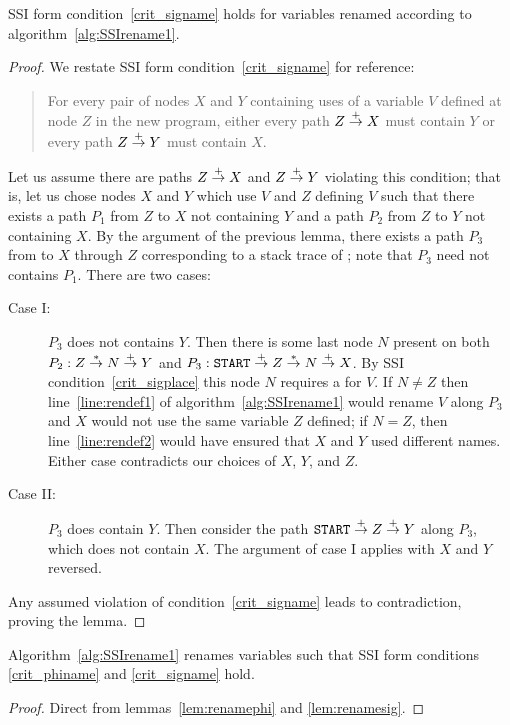 \documentclass[12pt,titlepage,twoside]{article}
\begin{document}
\begin{lemma}\label{lem:renamesig}
SSI form condition~\ref{crit_signame} holds for variables renamed
according to algorithm~\ref{alg:SSIrename1}.
\end{lemma}
\begin{proof}
We restate SSI form condition~\ref{crit_signame} for reference:
\begin{quote}
For every pair of nodes $X$ and $Y$ containing uses of a
variable $V$ defined at node $Z$ in the new program, either every path
$Z \stackrel{+}{\rightarrow} X$ must contain $Y$ or every path $Z \stackrel{+}{\rightarrow} Y$ must
contain $X$.
\end{quote}
Let us assume there are paths $Z\stackrel{+}{\rightarrow} X$ and $Z\stackrel{+}{\rightarrow} Y$
violating this condition; that is, let us chose nodes $X$ and $Y$
which use $V$ and $Z$ defining $V$ such that there exists a path $P_1$
from $Z$ to $X$ not containing $Y$ and a path $P_2$ from $Z$ to $Y$ not
containing $X$.  By the argument of the previous lemma, there exists
a path $P_3$ from  to $X$ through $Z$ corresponding to a stack
trace of ; note that $P_3$ need not contains $P_1$.
There are two cases:
\begin{description}
\item[Case I:] $P_3$ does not contains $Y$.  Then there is some last
node $N$ present on both $P_2: Z\stackrel{*}{\rightarrow} N\stackrel{+}{\rightarrow} Y$ and
$P_3: \texttt{START}\stackrel{+}{\rightarrow} Z\stackrel{*}{\rightarrow} N\stackrel{+}{\rightarrow} X$.  By SSI
condition~\ref{crit_sigplace} this node $N$ requires a \sigfunction{}
for $V$.  If $N\not=Z$ then line~\ref{line:rendef1} of
algorithm~\ref{alg:SSIrename1} would rename $V$ along $P_3$
and $X$ would not use the same variable $Z$ defined; if
$N=Z$, then line~\ref{line:rendef2} would have ensured that $X$
and $Y$ used different names.  Either case contradicts our choices of
$X$, $Y$, and $Z$.
\item[Case II:] $P_3$ does contain $Y$.  Then consider the path
$\texttt{START}\stackrel{+}{\rightarrow} Z\stackrel{+}{\rightarrow} Y$ along $P_3$, which does not
contain $X$.  The argument of case I applies with $X$ and $Y$ reversed.
\end{description}
Any assumed violation of condition~\ref{crit_signame} leads to
contradiction, proving the lemma.
\end{proof}

\begin{theorem}\label{thm:renameproof}
Algorithm~\ref{alg:SSIrename1} renames variables such that SSI form
conditions \ref{crit_phiname} and \ref{crit_signame} hold.
\end{theorem}
\begin{proof}
Direct from lemmas~\ref{lem:renamephi} and \ref{lem:renamesig}.
\end{proof}
\end{document}

